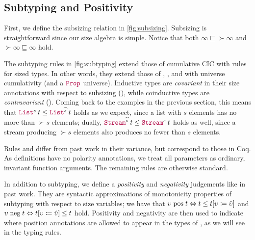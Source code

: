 \iffalse
We also use the metafunction \whnf to denote the reduction of a term to weak head normal form,
which would have the form of a universe, a function type, an unapplied function,
a \coinductive type (applied or unapplied), a constructor (applied or unapplied),
an assumption variable (applied or unapplied), or an unapplied \cofixpoint,
with arguments and inner terms unreduced.
\fi

\subsection{Subtyping and Positivity}\label{subsec:typing:subtyping}



First, we define the subsizing relation in \autoref{fig:subsizing}.
Subsizing is straightforward since our size algebra is simple.
Notice that both $\infty \sqsubseteq \succ{\infty}$ and $\succ{\infty} \sqsubseteq \infty$ hold.



The subtyping rules in \autoref{fig:subtyping} extend those of cumulative CIC with rules for sized \coinductive types.
In other words, they extend those of \CIChat, \CIChatminus, and \CChatomega with universe cumulativity (and a $\Prop$ universe).
Inductive types are \emph{covariant} in their size annotations with respect to subsizing (),
while coinductive types are \emph{contravariant} ().
Coming back to the examples in the previous section, this means that
$\app{\List^{s}}{t} \leq \app{\List^{\succ{s}}}{t}$ holds as we expect,
since a list with $s$ elements has no more than $\succ{s}$ elements;
dually, $\app{\Stream^{\succ{s}}}{t} \leq \app{\Stream^{s}}{t}$ holds as well,
since a stream producing $\succ{s}$ elements also produces no fewer than $s$ elements.

Rules  and  differ from past work in their variance, but correspond to those in Coq.
As \coinductive definitions have no polarity annotations,
we treat all parameters as ordinary, invariant function arguments.
The remaining rules are otherwise standard.



In addition to subtyping, we define a \textit{positivity} and \textit{negativity} judgements like in past work.
They are syntactic approximations of monotonicity properties of subtyping with respect to size variables;
we have that
$\upsilon \mathrel{\text{pos}} t \Leftrightarrow t \leq t [\upsilon \coloneqq \hat{\upsilon}]$ and
$\upsilon \mathrel{\text{neg}} t \Leftrightarrow t [\upsilon \coloneqq \hat{\upsilon}] \leq t$ hold.
Positivity and negativity are then used to indicate where position annotations are allowed to appear in the types of \cofixpoints,
as we will see in the typing rules.


